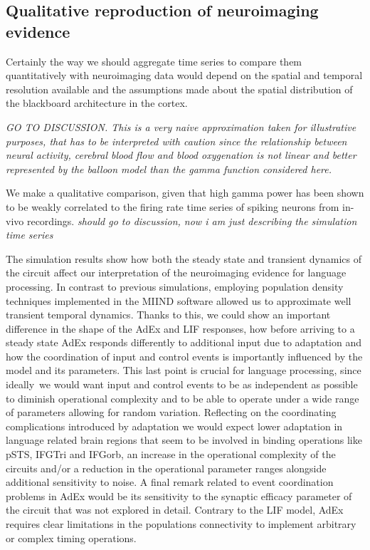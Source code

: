 \documentclass[10pt]{article}
\begin{document}
\subsection{Qualitative reproduction of neuroimaging evidence}


Certainly the way we should aggregate time series to compare them quantitatively with neuroimaging data would depend on the spatial and temporal resolution available and the assumptions made about the spatial distribution of the blackboard architecture in the cortex.


\emph{GO TO DISCUSSION. This is a very naive approximation taken for illustrative purposes, that has to be interpreted with caution since the relationship between neural activity, cerebral blood flow and blood oxygenation is not linear\cite{Friston_2000,Buxton_2004} and better represented by the balloon model than the gamma function considered here\cite{Waldorp_2009}.}


We make a qualitative comparison, given that high gamma power has been shown to be weakly correlated to the firing rate time series of spiking neurons from in-vivo recordings\cite{Ray_2011}. \emph{should go to discussion, now i am just describing the simulation time series}


The simulation results show how both the steady state and transient dynamics of the circuit affect our interpretation of the neuroimaging evidence for language processing.
In contrast to previous simulations\cite{van_der_Velde_2011,van_der_Velde_2010,Frank_2014,van_Dijk_2015}, employing population density techniques implemented in the MIIND software\cite{de_Kamps_2008} allowed us to approximate well transient temporal dynamics.
Thanks to this, we could show an important difference in the shape of the AdEx and LIF responses, how before arriving to a steady state AdEx responds differently to additional input due to adaptation and how the coordination of input and control events is importantly influenced by the model and its parameters.
This last point is crucial for language processing, since ideally~we would want input and control events to be as independent as possible to diminish operational complexity and to be able to operate under a wide range of parameters allowing for random variation.
Reflecting on the coordinating complications introduced by adaptation we would expect lower adaptation in language related brain regions that seem to be involved in binding operations like pSTS, IFGTri and IFGorb, an increase in the operational complexity of the circuits and/or a reduction in the operational parameter ranges alongside additional sensitivity to noise.
A final remark related to event coordination problems in AdEx would be its sensitivity to the synaptic efficacy parameter of the circuit that was not explored in detail.
Contrary to the LIF model, AdEx requires clear limitations in the populations connectivity to implement arbitrary or complex timing operations.
\end{document}
